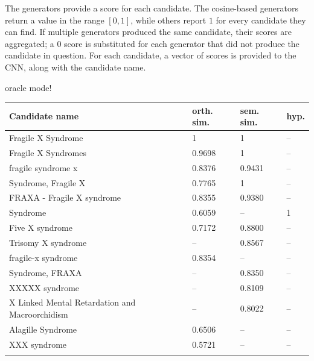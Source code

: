 \documentclass{bioinfo}
\begin{document}
The generators provide a score for each candidate.
The cosine-based generators return a value in the range $[0,1]$, while others report $1$ for every candidate they can find.
If multiple generators produced the same candidate, their scores are aggregated; a $0$ score is substituted for each generator that did not produce the candidate in question.
For each candidate, a vector of scores is provided to the CNN, along with the candidate name.

oracle mode!

\begin{table}[!t]
{\begin{tabular}{@{}llll@{}}\toprule
  Candidate name & orth. sim. & sem. sim. & hyp.\\\midrule
  Fragile X Syndrome                             & 1      & 1      & --\\
  Fragile X Syndromes                            & 0.9698 & 1      & --\\
  fragile syndrome x                             & 0.8376 & 0.9431 & --\\
  Syndrome, Fragile X                            & 0.7765 & 1      & --\\
  FRAXA - Fragile X syndrome                     & 0.8355 & 0.9380 & --\\
  Syndrome                                       & 0.6059 & --     & 1 \\
  Five X syndrome                                & 0.7172 & 0.8800 & --\\
  Trisomy X syndrome                             & --     & 0.8567 & --\\
  fragile-x syndrome                             & 0.8354 & --     & --\\
  Syndrome, FRAXA                                & --     & 0.8350 & --\\
  XXXXX syndrome                                 & --     & 0.8109 & --\\
  X Linked Mental Retardation and Macroorchidism & --     & 0.8022 & --\\
  Alagille Syndrome                              & 0.6506 & --     & --\\
  XXX syndrome                                   & 0.5721 & --     & --\\
  \botrule
\end{tabular}}{}
\end{table}
\end{document}
